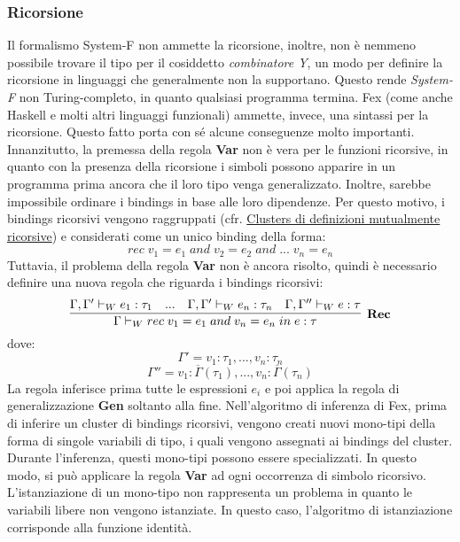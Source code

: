 \documentclass[10pt,a4paper]{article}
\begin{document}
\hypertarget{Ricorsione}{\subsubsection{Ricorsione}}
Il formalismo System-F non ammette la ricorsione, inoltre, non è nemmeno possibile
trovare il tipo per il cosiddetto \textit{combinatore Y}, un modo per definire la ricorsione in linguaggi che
generalmente non la supportano. Questo rende \textit{System-F} non Turing-completo, in quanto qualsiasi programma
termina. Fex (come anche Haskell e molti altri linguaggi funzionali) ammette, invece, una sintassi per la ricorsione.
Questo fatto porta con sé alcune conseguenze molto importanti. Innanzitutto, la premessa della regola \textbf{Var}
non è vera per le funzioni ricorsive, in quanto con la presenza della ricorsione i simboli possono apparire in un
programma prima ancora che il loro tipo venga generalizzato. Inoltre, sarebbe impossibile ordinare i bindings in base
alle loro dipendenze. Per questo motivo, i bindings ricorsivi vengono raggruppati
(cfr. \hyperlink{Clusters di definizioni mutualmente ricorsive}{Clusters di definizioni mutualmente ricorsive}) e
considerati come un unico binding della forma:
\[ rec \; v_1 = e_1 \; and \; v_2 = e_2 \; and \; ... \; v_n = e_n \]
Tuttavia, il problema della regola \textbf{Var} non è ancora risolto, quindi è necessario definire una nuova regola
che riguarda i bindings ricorsivi:
\[ \infer[\textbf{Rec}]{\Gamma \vdash_W rec \; v_1 = e_1 \; and \; v_n = e_n \; in \; e : \tau }{\Gamma, \Gamma' \vdash_W e_1 : \tau_1 & ... & \Gamma, \Gamma' \vdash_W e_n : \tau_n & \Gamma, \Gamma'' \vdash_W e : \tau } \]
dove:
\[ \Gamma' = v_1 : \tau_1, ..., v_n : \tau_n \]
\[ \Gamma'' = v_1 : \overline{\Gamma}(\tau_1), ..., v_n : \overline{\Gamma}(\tau_n) \]
La regola inferisce prima tutte le espressioni $ e_i $ e poi applica la regola di generalizzazione \textbf{Gen} soltanto
alla fine. Nell'algoritmo di inferenza di Fex, prima di inferire un cluster di bindings ricorsivi, vengono creati
nuovi mono-tipi della forma di singole variabili di tipo, i quali vengono assegnati ai bindings del cluster.
Durante l'inferenza,
questi mono-tipi possono essere specializzati. In questo modo, si può applicare la regola
\textbf{Var} ad ogni occorrenza di simbolo ricorsivo. L'istanziazione di un mono-tipo non rappresenta un problema
in quanto le variabili libere non vengono istanziate. In questo caso, l'algoritmo di istanziazione corrisponde
alla funzione identità.
\end{document}
